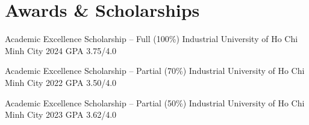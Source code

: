 \section{Awards \& Scholarships}

\resumeEntry
    {Academic Excellence Scholarship -- Full (100\%)}
    {Industrial University of Ho Chi Minh City}
    {2024}
    {GPA 3.75/4.0}

\vspace{4pt}

\resumeEntry
    {Academic Excellence Scholarship -- Partial (70\%)}
    {Industrial University of Ho Chi Minh City}
    {2022}
    {GPA 3.50/4.0}

\vspace{4pt}

\resumeEntry
    {Academic Excellence Scholarship -- Partial (50\%)}
    {Industrial University of Ho Chi Minh City}
    {2023}
    {GPA 3.62/4.0}
